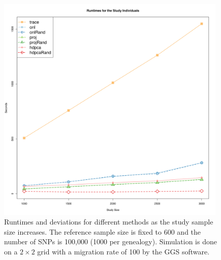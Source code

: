 \documentclass{article}
\begin{document}
\begin{figure}[p]
  \centering
  \includegraphics[width=0.98\textwidth]{mChg}
  \caption{
    Runtimes and deviations for different methods as the study sample size increases.
    The reference sample size is fixed to 600 and the number of SNPs is 100,000 (1000 per genealogy).
    Simulation is done on a $2 \times 2$ grid with a migration rate of 100 by the GGS software. 
  }
  \label{fig:mChg}
\end{figure}






\newpage
 

\newpage
\end{document}
